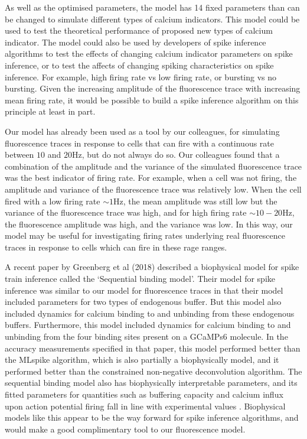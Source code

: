 As well as the optimised parameters, the model has 14 fixed parameters than can be changed to simulate different types of calcium indicators. This model could be used to test the theoretical performance of proposed new types of calcium indicator. The model could also be used by developers of spike inference algorithms to test the effects of changing calcium indicator parameters on spike inference, or to test the affects of changing spiking characteristics on spike inference. For example, high firing rate vs low firing rate, or bursting vs no bursting. Given the increasing amplitude of the fluorescence trace with increasing mean firing rate, it would be possible to build a spike inference algorithm on this principle at least in part.

Our model has already been used as a tool by our colleagues, for simulating fluorescence traces in response to cells that can fire with a continuous rate between $10$ and $20$Hz, but do not always do so. Our colleagues found that a combination of the amplitude and the variance of the simulated fluorescence trace was the best indicator of firing rate. For example, when a cell was not firing, the amplitude and variance of the fluorescence trace was relatively low. When the cell fired with a low firing rate $\sim 1$Hz, the mean amplitude was still low but the variance of the fluorescence trace was high, and for high firing rate $\sim 10-20$Hz, the fluorescence amplitude was high, and the variance was low. In this way, our model may be useful for investigating firing rates underlying real fluorescence traces in response to cells which can fire in these rage ranges.

A recent paper by Greenberg et al (2018) described a biophysical model for spike train inference called the `Sequential binding model'. Their model for spike inference was similar to our model for fluorescence traces in that their model included parameters for two types of endogenous buffer. But this model also included dynamics for calcium binding to and unbinding from these endogenous buffers. Furthermore, this model included dynamics for calcium binding to and unbinding from the four binding sites present on a GCaMPs6 molecule. In the accuracy measurements specified in that paper, this model performed better than the MLspike algorithm, which is also partially a biophysically model, and it performed better than the constrained non-negative deconvolution algorithm. The sequential binding model also has biophysically interpretable parameters, and its fitted parameters for quantities such as buffering capacity and calcium influx upon action potential firing fall in line with experimental values \parencite{greenberg}. Biophysical models like this appear to be the way forward for spike inference algorithms, and would make a good complimentary tool to our fluorescence model.
